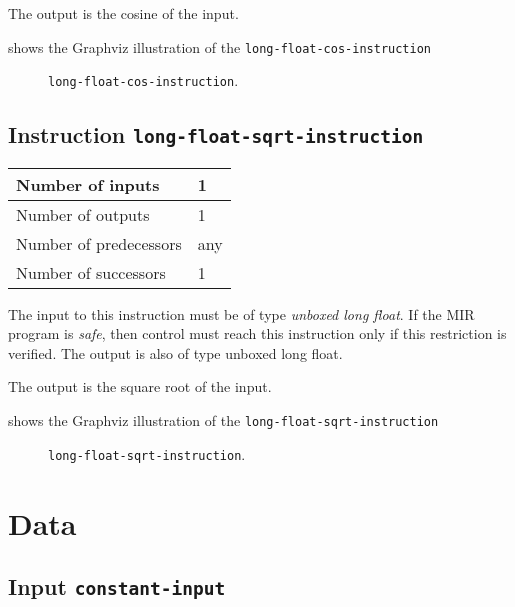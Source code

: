 The output is the cosine of the input.

 shows the Graphviz illustration of the
\texttt{long-float-cos-instruction}

\begin{figure}
\begin{center}
\end{center}
\caption{\label{fig-long-float-cos-instruction}
\texttt{long-float-cos-instruction}.}
\end{figure}

\subsection{Instruction \texttt{long-float-sqrt-instruction}}
\label{mir-instruction-long-float-div}

\begin{tabular}{|l|l|}
\hline
Number of inputs & 1\\
\hline
Number of outputs & 1\\
\hline
Number of predecessors & any\\
\hline
Number of successors & 1\\
\hline
\end{tabular}

The input to this instruction must be of type \emph{unboxed long
  float}.  If the MIR program is \emph{safe}, then control must reach
this instruction only if this restriction is verified.  The output is
also of type unboxed long float.

The output is the square root of the input.

 shows the Graphviz illustration of the
\texttt{long-float-sqrt-instruction}

\begin{figure}
\begin{center}
\end{center}
\caption{\label{fig-long-float-sqrt-instruction}
\texttt{long-float-sqrt-instruction}.}
\end{figure}

\section{Data}

\subsection{Input \texttt{constant-input}}

